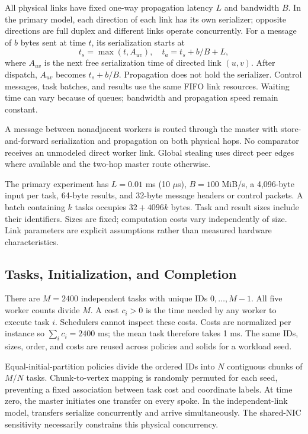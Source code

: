 \documentclass[10pt,journal,twocolumn]{IEEEtran}
\begin{document}
All physical links have fixed one-way propagation latency $L$ and bandwidth $B$. In the primary model, each direction of each link has its own serializer; opposite directions are full duplex and different links operate concurrently. For a message of $b$ bytes sent at time $t$, its serialization starts at
\begin{equation}
t_s=\max(t,A_{uv}),\quad t_a=t_s+b/B+L,
\end{equation}
where $A_{uv}$ is the next free serialization time of directed link $(u,v)$. After dispatch, $A_{uv}$ becomes $t_s+b/B$. Propagation does not hold the serializer. Control messages, task batches, and results use the same FIFO link resources. Waiting time can vary because of queues; bandwidth and propagation speed remain constant.

A message between nonadjacent workers is routed through the master with store-and-forward serialization and propagation on both physical hops. No comparator receives an unmodeled direct worker link. Global stealing uses direct peer edges where available and the two-hop master route otherwise.

The primary experiment has $L=0.01$ ms (10 $\mu$s), $B=100$ MiB/s, a 4,096-byte input per task, 64-byte results, and 32-byte message headers or control packets. A batch containing $k$ tasks occupies $32+4096k$ bytes. Task and result sizes include their identifiers. Sizes are fixed; computation costs vary independently of size. Link parameters are explicit assumptions rather than measured hardware characteristics.

\subsection{Tasks, Initialization, and Completion}
There are $M=2400$ independent tasks with unique IDs $0,\ldots,M-1$. All five worker counts divide $M$. A cost $c_i>0$ is the time needed by any worker to execute task $i$. Schedulers cannot inspect these costs. Costs are normalized per instance so $\sum_i c_i=2400$ ms; the mean task therefore takes 1 ms. The same IDs, sizes, order, and costs are reused across policies and solids for a workload seed.

Equal-initial-partition policies divide the ordered IDs into $N$ contiguous chunks of $M/N$ tasks. Chunk-to-vertex mapping is randomly permuted for each seed, preventing a fixed association between task cost and coordinate labels. At time zero, the master initiates one transfer on every spoke. In the independent-link model, transfers serialize concurrently and arrive simultaneously. The shared-NIC sensitivity necessarily constrains this physical concurrency.
\end{document}
